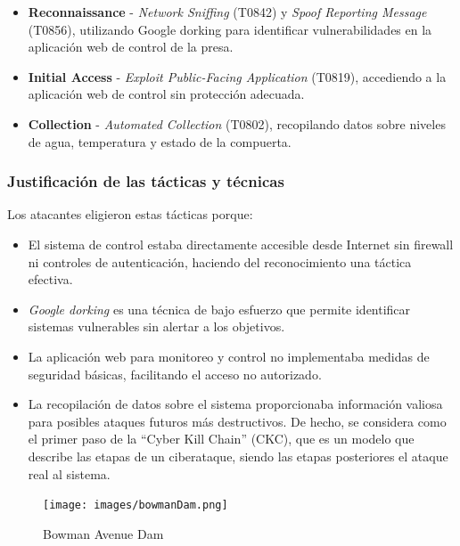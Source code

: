 \begin{itemize}
    \item \textbf{Reconnaissance} - \textit{Network Sniffing} (T0842) y \textit{Spoof Reporting Message} (T0856), utilizando Google dorking para identificar vulnerabilidades en la aplicación web de control de la presa.
    
    \item \textbf{Initial Access} - \textit{Exploit Public-Facing Application} (T0819), accediendo a la aplicación web de control sin protección adecuada.
    
    \item \textbf{Collection} - \textit{Automated Collection} (T0802), recopilando datos sobre niveles de agua, temperatura y estado de la compuerta.
\end{itemize}

\subsubsection{Justificación de las tácticas y técnicas}
Los atacantes eligieron estas tácticas porque:

\begin{itemize}
    \item El sistema de control estaba directamente accesible desde Internet sin firewall ni controles de autenticación, haciendo del reconocimiento una táctica efectiva.
        
        \item \textit{Google dorking} es una técnica de bajo esfuerzo que permite identificar sistemas vulnerables sin alertar a los objetivos.
        
        \item La aplicación web para monitoreo y control no implementaba medidas de seguridad básicas, facilitando el acceso no autorizado.
        
        \item La recopilación de datos sobre el sistema proporcionaba información valiosa para posibles ataques futuros más destructivos.
        De hecho, se considera como el primer paso de la ``Cyber Kill Chain'' (CKC), que es un modelo que describe las etapas de un ciberataque, siendo las etapas posteriores el ataque real al sistema.
\end{itemize}

\newpage

\begin{figure}[htbp]
    \centering
    \texttt{[image: images/bowmanDam.png]}
    \caption{Bowman Avenue Dam}
    \label{fig:bowmanDam}
\end{figure}

